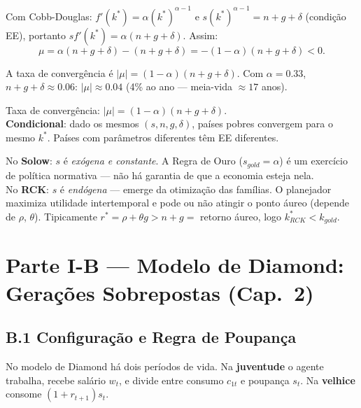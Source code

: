\documentclass[12pt, a4paper]{article}
\begin{document}
Com Cobb-Douglas: $f'(k^*) = \alpha(k^*)^{\alpha-1}$ e $s(k^*)^{\alpha-1} = n+g+\delta$ (condição EE), portanto $sf'(k^*) = \alpha(n+g+\delta)$. Assim:
\[
\mu = \alpha(n+g+\delta) - (n+g+\delta) = -(1-\alpha)(n+g+\delta) < 0.
\]

A taxa de convergência é $|\mu| = (1-\alpha)(n+g+\delta)$. Com $\alpha=0.33$, $n+g+\delta\approx 0.06$: $|\mu|\approx 0.04$ (4\% ao ano --- meia-vida $\approx 17$ anos).

\begin{resultbox}[title={Convergência Condicional de Solow}]
Taxa de convergência: $|\mu| = (1-\alpha)(n+g+\delta)$.\\
\textbf{Condicional}: dado os mesmos $(s,n,g,\delta)$, países pobres convergem para o mesmo $k^*$. Países com parâmetros diferentes têm EE diferentes.
\end{resultbox}

\begin{provabox}[title={Solow vs.\ RCK --- Diferença Fundamental}]
No \textbf{Solow}: $s$ é \emph{exógena e constante}. A Regra de Ouro ($s_{gold}=\alpha$) é um exercício de política normativa --- não há garantia de que a economia esteja nela.\\
No \textbf{RCK}: $s$ é \emph{endógena} --- emerge da otimização das famílias. O planejador maximiza utilidade intertemporal e pode ou não atingir o ponto áureo (depende de $\rho$, $\theta$). Tipicamente $r^*=\rho+\theta g > n+g = $ retorno áureo, logo $k_{RCK}^* < k_{gold}$.
\end{provabox}

\section*{Parte I-B --- Modelo de Diamond: Gerações Sobrepostas (Cap.\ 2)}

\subsection*{B.1 Configuração e Regra de Poupança}

No modelo de Diamond há dois períodos de vida. Na \textbf{juventude} o agente trabalha, recebe salário $w_t$, e divide entre consumo $c_{1t}$ e poupança $s_t$. Na \textbf{velhice} consome $(1+r_{t+1})s_t$.
\end{document}
